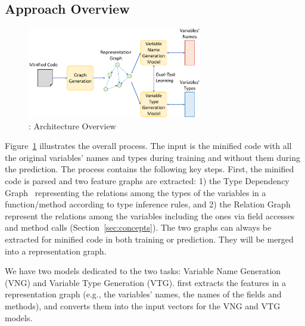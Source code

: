 \subsection{Approach Overview}


\begin{figure}[t]
	\begin{center}
	  \includegraphics[width=3in]{figures/overview-2.png}
          \vspace{-10pt}
		\caption{{\tool}: Architecture Overview}
		\label{overview}
	\end{center}
\end{figure}



Figure~\ref{overview} illustrates the overall process. The input is
the minified code with all the original variables' names and types
during training and without them during the prediction.
%
The process contains the following key steps. First, the minified code
is parsed and two feature graphs are extracted: 1) the Type Dependency
Graph~\cite{type-graph-icse22} representing the relations among the
types of the variables in a function/method according to type
inference rules, and 2) the Relation Graph~\cite{icse19} represent the
relations among the variables including the ones via field accesses
and method calls (Section~\ref{sec:concepts}). The two graphs can
always be extracted for minified code in both training or
prediction. They will be merged into a representation graph.

We have two models dedicated to the two tasks: Variable Name
Generation (VNG) and Variable Type Generation (VTG). {\tool}
first extracts the features in a representation graph (e.g., the
variables' names, the names of the fields and methods), and converts
them into the input vectors for the VNG and VTG models.

